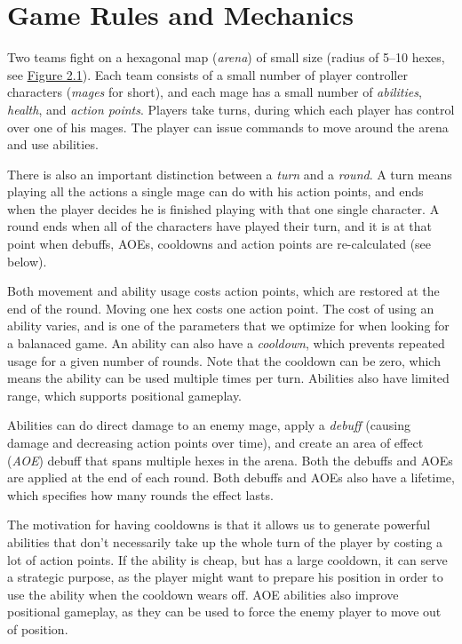 \chapter{Game Rules and Mechanics}
\label{chapter02}

Two teams fight on a hexagonal map (\emph{arena}) of small size (radius of
5--10 hexes, see \hyperref[fig:arena]{Figure 2.1}). Each team consists of a small number of player controller
characters (\emph{mages} for short), and each mage has a small number of
\emph{abilities}, \emph{health}, and \emph{action points}. Players take turns, during
which each player has control over one of his mages. The player can issue
commands to move around the arena and use abilities.

There is also an important distinction between a \emph{turn} and a \emph{round}.
A turn means playing all the actions a single mage can do with his action points,
and ends when the player decides he is finished playing with that one single character.
A round ends when all of the characters have played their turn, and it is at that point
when debuffs, AOEs, cooldowns and action points are re-calculated (see below).

Both movement and ability usage costs action points, which are restored at the
end of the round. Moving one hex costs one action point. The cost of using an
ability varies, and is one of the parameters that we optimize for when looking
for a balanaced game. An ability can also have a \emph{cooldown}, which
prevents repeated usage for a given number of rounds. Note that the cooldown
can be zero, which means the ability can be used multiple times per turn.
Abilities also have limited range, which supports positional gameplay.

Abilities can do direct damage to an enemy mage, apply a \emph{debuff} (causing
damage and decreasing action points over time), and create an area of effect
(\emph{AOE}) debuff that spans multiple hexes in the arena. Both the debuffs and
AOEs are applied at the end of each round. Both debuffs and AOEs also have a lifetime,
which specifies how many rounds the effect lasts.

The motivation for having cooldowns is that it allows us to generate powerful
abilities that don't necessarily take up the whole turn of the player by costing
a lot of action points. If the ability is cheap, but has a large cooldown, it can
serve a strategic purpose, as the player might want to prepare his position in order
to use the ability when the cooldown wears off. AOE abilities also improve positional
gameplay, as they can be used to force the enemy player to move out of position.

